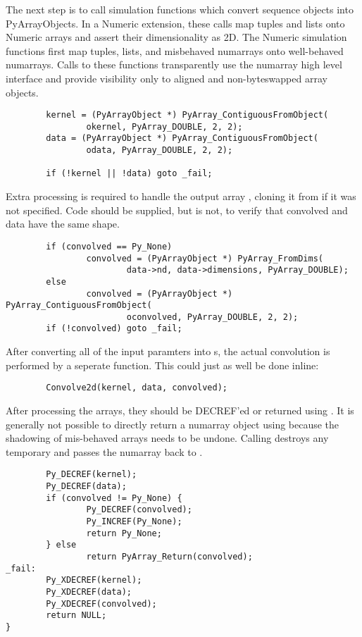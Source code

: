 The next step is to call simulation functions which convert sequence objects
into PyArrayObjects.  In a Numeric extension, these calls map tuples and lists
onto Numeric arrays and assert their dimensionality as 2D.  The Numeric
simulation functions first map tuples, lists, and misbehaved numarrays onto
well-behaved numarrays.  Calls to these functions transparently use the
numarray high level interface and provide visibility only to aligned and
non-byteswapped array objects.

\begin{verbatim}
        kernel = (PyArrayObject *) PyArray_ContiguousFromObject(
                okernel, PyArray_DOUBLE, 2, 2);
        data = (PyArrayObject *) PyArray_ContiguousFromObject(
                odata, PyArray_DOUBLE, 2, 2);

        if (!kernel || !data) goto _fail;
\end{verbatim}

Extra processing is required to handle the output array ,
cloning it from  if it was not specified.  Code should be supplied,
but is not, to verify that convolved and data have the same shape.  

\begin{verbatim}
        if (convolved == Py_None)
                convolved = (PyArrayObject *) PyArray_FromDims(
                        data->nd, data->dimensions, PyArray_DOUBLE);
        else
                convolved = (PyArrayObject *) PyArray_ContiguousFromObject(
                        oconvolved, PyArray_DOUBLE, 2, 2);
        if (!convolved) goto _fail;
\end{verbatim}

After converting all of the input paramters into s, the
actual convolution is performed by a seperate function.  This could just as
well be done inline:

\begin{verbatim}
        Convolve2d(kernel, data, convolved);
\end{verbatim}

After processing the arrays, they should be DECREF'ed or returned using
.  It is generally not possible to directly return a
numarray object using  because the shadowing of
mis-behaved arrays needs to be undone.  Calling 
destroys any temporary and passes the numarray back to \python.

\begin{verbatim}
        Py_DECREF(kernel);
        Py_DECREF(data);
        if (convolved != Py_None) {
                Py_DECREF(convolved);
                Py_INCREF(Py_None);
                return Py_None;
        } else
                return PyArray_Return(convolved);
_fail:
        Py_XDECREF(kernel);
        Py_XDECREF(data);
        Py_XDECREF(convolved);
        return NULL;
}
\end{verbatim}


